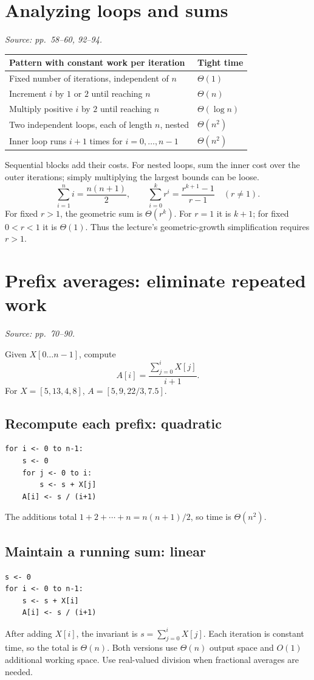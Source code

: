 \documentclass[11pt]{article}
\begin{document}
\section{Analyzing loops and sums}
\textit{Source: pp.\ 58--60, 92--94.}
\begin{center}
\begin{tabularx}{\textwidth}{Xl}
\toprule
Pattern with constant work per iteration & Tight time\\
\midrule
Fixed number of iterations, independent of $n$ & $\Theta(1)$\\
Increment $i$ by $1$ or $2$ until reaching $n$ & $\Theta(n)$\\
Multiply positive $i$ by $2$ until reaching $n$ & $\Theta(\log n)$\\
Two independent loops, each of length $n$, nested & $\Theta(n^2)$\\
Inner loop runs $i+1$ times for $i=0,\ldots,n-1$ & $\Theta(n^2)$\\
\bottomrule
\end{tabularx}
\end{center}
Sequential blocks add their costs. For nested loops, sum the inner cost over the outer iterations; simply multiplying the largest bounds can be loose.
\[
\sum_{i=1}^n i=\frac{n(n+1)}2,\qquad
\sum_{i=0}^k r^i=\frac{r^{k+1}-1}{r-1}\quad(r\ne1).
\]
For fixed $r>1$, the geometric sum is $\Theta(r^k)$. For $r=1$ it is $k+1$; for fixed $0<r<1$ it is $\Theta(1)$. Thus the lecture's geometric-growth simplification requires $r>1$.

\section{Prefix averages: eliminate repeated work}
\textit{Source: pp.\ 70--90.}

Given $X[0\ldots n-1]$, compute
\[
A[i]=\frac{\sum_{j=0}^{i}X[j]}{i+1}.
\]
For $X=[5,13,4,8]$, $A=[5,9,22/3,7.5]$.

\subsection{Recompute each prefix: quadratic}
\begin{lstlisting}
for i <- 0 to n-1:
    s <- 0
    for j <- 0 to i:
        s <- s + X[j]
    A[i] <- s / (i+1)
\end{lstlisting}
The additions total $1+2+\cdots+n=n(n+1)/2$, so time is $\Theta(n^2)$.

\subsection{Maintain a running sum: linear}
\begin{lstlisting}
s <- 0
for i <- 0 to n-1:
    s <- s + X[i]
    A[i] <- s / (i+1)
\end{lstlisting}
After adding $X[i]$, the invariant is $s=\sum_{j=0}^iX[j]$. Each iteration is constant time, so the total is $\Theta(n)$. Both versions use $\Theta(n)$ output space and $O(1)$ additional working space. Use real-valued division when fractional averages are needed.
\end{document}
